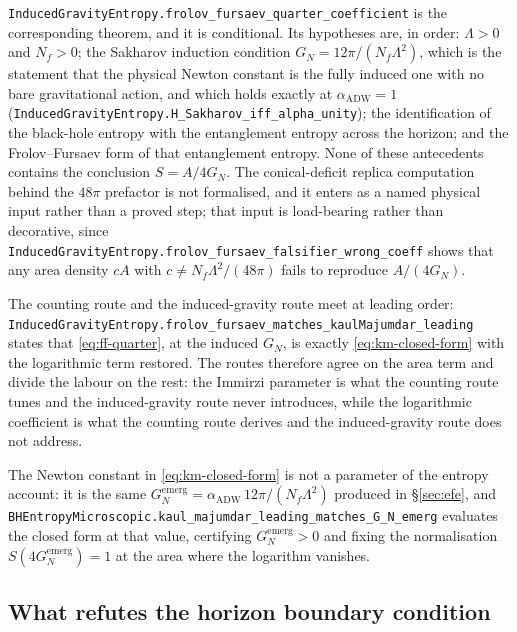 \documentclass[aps,prd,nofootinbib,superscriptaddress,12pt]{revtex4-2}
\DeclareRobustCommand{\lb}{\discretionary{}{}{}}
\begin{document}
\texttt{Induced\lb{}Gravity\lb{}Entropy.\lb{}frolov\_\lb{}fursaev\_\lb{}quarter\_\lb{}coefficient} is the corresponding
theorem, and it is conditional. Its hypotheses are, in order: $\Lambda > 0$ and $N_f > 0$;
the Sakharov induction condition $G_N = 12\pi/(N_f\Lambda^2)$, which is the statement that
the physical Newton constant is the fully induced one with no bare gravitational action,
and which holds exactly at $\alpha_{\mathrm{ADW}} = 1$
(\texttt{Induced\lb{}Gravity\lb{}Entropy.\lb{}H\_\lb{}Sakharov\_\lb{}iff\_\lb{}alpha\_\lb{}unity}); the identification of the
black-hole entropy with the entanglement entropy across the horizon; and the Frolov--Fursaev
form of that entanglement entropy. None of these antecedents contains the conclusion
$S = A/4G_N$. The conical-deficit replica computation behind the $48\pi$ prefactor is not
formalised, and it enters as a named physical input rather than a proved step; that input
is load-bearing rather than decorative, since
\texttt{Induced\lb{}Gravity\lb{}Entropy.\lb{}frolov\_\lb{}fursaev\_\lb{}falsifier\_\lb{}wrong\_\lb{}coeff} shows that any area
density $cA$ with $c \neq N_f\Lambda^2/(48\pi)$ fails to reproduce $A/(4G_N)$.

The counting route and the induced-gravity route meet at leading order:
\texttt{Induced\lb{}Gravity\lb{}Entropy.\lb{}frolov\_\lb{}fursaev\_\lb{}matches\_\lb{}kaul\lb{}Majumdar\_\lb{}leading} states that
\eqref{eq:ff-quarter}, at the induced $G_N$, is exactly \eqref{eq:km-closed-form} with the
logarithmic term restored. The routes therefore agree on the area term and divide the
labour on the rest: the Immirzi parameter is what the counting route tunes and the
induced-gravity route never introduces, while the logarithmic coefficient is what the
counting route derives and the induced-gravity route does not address.

The Newton constant in \eqref{eq:km-closed-form} is not a parameter of the entropy account:
it is the same $G_N^{\mathrm{emerg}} = \alpha_{\mathrm{ADW}}\,12\pi/(N_f\Lambda^2)$ produced
in \S\ref{sec:efe}, and
\texttt{BHEntropy\lb{}Microscopic.\lb{}kaul\_\lb{}majumdar\_\lb{}leading\_\lb{}matches\_\lb{}G\_\lb{}N\_\lb{}emerg} evaluates the
closed form at that value, certifying $G_N^{\mathrm{emerg}} > 0$ and fixing the
normalisation $S(4G_N^{\mathrm{emerg}}) = 1$ at the area where the logarithm vanishes.

\subsection{What refutes the horizon boundary condition}
\label{sec:entropy-falsifiers}
\end{document}

